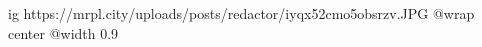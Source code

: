  
 
 
 
 

\ifcmt
  ig https://mrpl.city/uploads/posts/redactor/iyqx52cmo5obsrzv.JPG
  @wrap center
  @width 0.9
\fi

